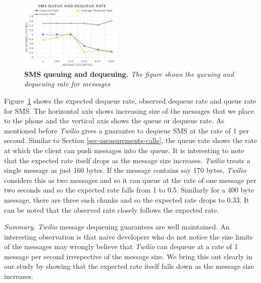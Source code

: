 \begin{figure} \centering
\includegraphics[width=0.45\textwidth]{graphs/sms.pdf}
\caption{\textbf{SMS queuing and dequeuing.} {\footnotesize\textit{
The figure shows the queuing and dequeuing rate for messages
}}}
\label{fig:sms}
\end{figure}

Figure~\ref{fig:sms} shows the expected dequeue rate, observed dequeue rate and queue rate for SMS. The horizontal axis shows increasing size of the messages that we place to the phone and the vertical axis shows the queue or dequeue rate. As mentioned before \textit{Twilio} gives a guarantee to dequeue SMS at the rate of 1 per second. Similar to Section \ref{sec-measurements-calls}, the queue rate shows the rate at which the client can push messages into the queue. It is interesting to note that the expected rate itself drops as the message size increases. \textit{Twilio} treats a single message as just 160 bytes. If the message contains say 170 bytes, \textit{Twilio} considers this as two messages and so it can queue at the rate of one message per two seconds and so the expected rate falls from 1 to 0.5. Similarly for a 400 byte message, there are three such chunks and so the expected rate drops to 0.33. It can be noted that the observed rate closely follows the expected rate. 

\textit{Summary}. \textit{Twilio} message dequeuing guarantees are well maintained. An interesting observation is that naive developers who do not notice the size limits of the messages may wrongly believe that \textit{Twilio} can dequeue at a rate of 1 message per second irrespective of the message size. We bring this out clearly in our study by showing that the expected rate itself falls down as the message size increases. 





